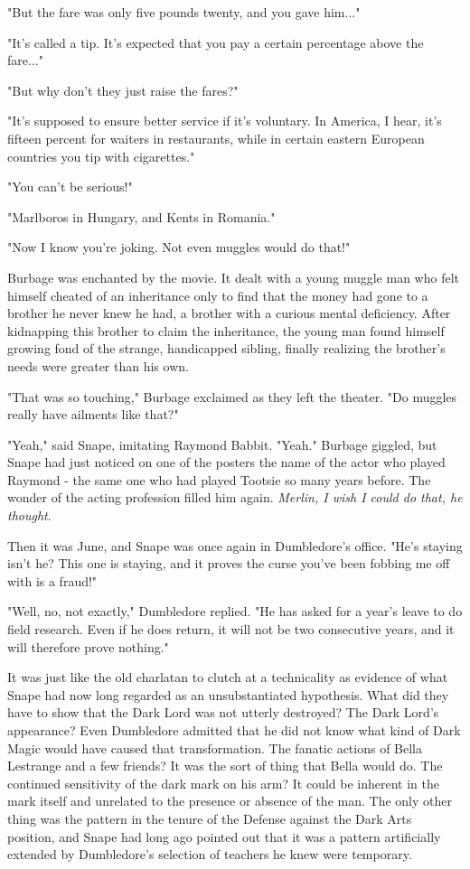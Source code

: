 \documentclass[a4paper,11pt]{article}
\begin{document}
"But the fare was only five pounds twenty, and you gave him..."

"It's called a tip. It's expected that you pay a certain percentage above the fare..."

"But why don't they just raise the fares?"

"It's supposed to ensure better service if it's voluntary. In America, I hear, it's fifteen percent for waiters in restaurants, while in certain eastern European countries you tip with cigarettes."

"You can't be serious!"

"Marlboros in Hungary, and Kents in Romania."

"Now I know you're joking. Not even muggles would do that!"

Burbage was enchanted by the movie. It dealt with a young muggle man who felt himself cheated of an inheritance only to find that the money had gone to a brother he never knew he had, a brother with a curious mental deficiency. After kidnapping this brother to claim the inheritance, the young man found himself growing fond of the strange, handicapped sibling, finally realizing the brother's needs were greater than his own.

"That was so touching," Burbage exclaimed as they left the theater. "Do muggles really have ailments like that?"

"Yeah," said Snape, imitating Raymond Babbit. "Yeah." Burbage giggled, but Snape had just noticed on one of the posters the name of the actor who played Raymond - the same one who had played Tootsie so many years before. The wonder of the acting profession filled him again. \emph{Merlin, I wish I could do that, he thought}.

Then it was June, and Snape was once again in Dumbledore's office. "He's staying isn't he? This one is staying, and it proves the curse you've been fobbing me off with is a fraud!"

"Well, no, not exactly," Dumbledore replied. "He has asked for a year's leave to do field research. Even if he does return, it will not be two consecutive years, and it will therefore prove nothing."

It was just like the old charlatan to clutch at a technicality as evidence of what Snape had now long regarded as an unsubstantiated hypothesis. What did they have to show that the Dark Lord was not utterly destroyed? The Dark Lord's appearance? Even Dumbledore admitted that he did not know what kind of Dark Magic would have caused that transformation. The fanatic actions of Bella Lestrange and a few friends? It was the sort of thing that Bella would do. The continued sensitivity of the dark mark on his arm? It could be inherent in the mark itself and unrelated to the presence or absence of the man. The only other thing was the pattern in the tenure of the Defense against the Dark Arts position, and Snape had long ago pointed out that it was a pattern artificially extended by Dumbledore's selection of teachers he knew were temporary.
\end{document}

